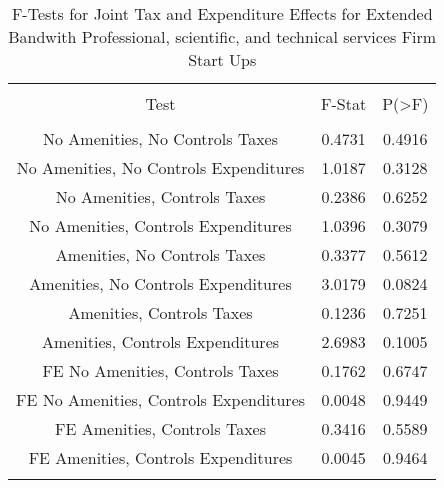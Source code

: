 
\begin{table}[!htbp] \centering 
  \caption{F-Tests for Joint Tax and Expenditure Effects for Extended Bandwith Professional, scientific, and technical services Firm Start Ups} 
  \label{54Ftests} 
\begin{tabular}{@{\extracolsep{5pt}} ccc} 
\\[-1.8ex]\hline 
\hline \\[-1.8ex] 
Test & F-Stat & P(\textgreater F) \\ 
\hline \\[-1.8ex] 
No Amenities, No Controls Taxes & 0.4731 & 0.4916 \\ 
No Amenities, No Controls Expenditures & 1.0187 & 0.3128 \\ 
No Amenities, Controls Taxes & 0.2386 & 0.6252 \\ 
No Amenities, Controls Expenditures & 1.0396 & 0.3079 \\ 
Amenities, No Controls Taxes & 0.3377 & 0.5612 \\ 
Amenities, No Controls Expenditures & 3.0179 & 0.0824 \\ 
Amenities, Controls Taxes & 0.1236 & 0.7251 \\ 
Amenities, Controls Expenditures & 2.6983 & 0.1005 \\ 
FE No Amenities, Controls Taxes & 0.1762 & 0.6747 \\ 
FE No Amenities, Controls Expenditures & 0.0048 & 0.9449 \\ 
FE Amenities, Controls Taxes & 0.3416 & 0.5589 \\ 
FE Amenities, Controls Expenditures & 0.0045 & 0.9464 \\ 
\hline \\[-1.8ex] 
\end{tabular} 
\end{table} 
